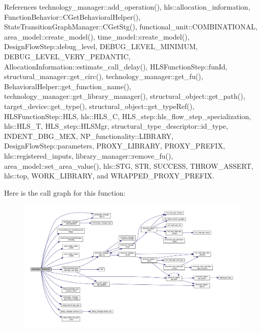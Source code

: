 References technology\+\_\+manager\+::add\+\_\+operation(), hls\+::allocation\+\_\+information, Function\+Behavior\+::\+C\+Get\+Behavioral\+Helper(), State\+Transition\+Graph\+Manager\+::\+C\+Get\+Stg(), functional\+\_\+unit\+::\+C\+O\+M\+B\+I\+N\+A\+T\+I\+O\+N\+AL, area\+\_\+model\+::create\+\_\+model(), time\+\_\+model\+::create\+\_\+model(), Design\+Flow\+Step\+::debug\+\_\+level, D\+E\+B\+U\+G\+\_\+\+L\+E\+V\+E\+L\+\_\+\+M\+I\+N\+I\+M\+UM, D\+E\+B\+U\+G\+\_\+\+L\+E\+V\+E\+L\+\_\+\+V\+E\+R\+Y\+\_\+\+P\+E\+D\+A\+N\+T\+IC, Allocation\+Information\+::estimate\+\_\+call\+\_\+delay(), H\+L\+S\+Function\+Step\+::fun\+Id, structural\+\_\+manager\+::get\+\_\+circ(), technology\+\_\+manager\+::get\+\_\+fu(), Behavioral\+Helper\+::get\+\_\+function\+\_\+name(), technology\+\_\+manager\+::get\+\_\+library\+\_\+manager(), structural\+\_\+object\+::get\+\_\+path(), target\+\_\+device\+::get\+\_\+type(), structural\+\_\+object\+::get\+\_\+type\+Ref(), H\+L\+S\+Function\+Step\+::\+H\+LS, hls\+::\+H\+L\+S\+\_\+C, H\+L\+S\+\_\+step\+::hls\+\_\+flow\+\_\+step\+\_\+specialization, hls\+::\+H\+L\+S\+\_\+T, H\+L\+S\+\_\+step\+::\+H\+L\+S\+Mgr, structural\+\_\+type\+\_\+descriptor\+::id\+\_\+type, I\+N\+D\+E\+N\+T\+\_\+\+D\+B\+G\+\_\+\+M\+EX, N\+P\+\_\+functionality\+::\+L\+I\+B\+R\+A\+RY, Design\+Flow\+Step\+::parameters, P\+R\+O\+X\+Y\+\_\+\+L\+I\+B\+R\+A\+RY, P\+R\+O\+X\+Y\+\_\+\+P\+R\+E\+F\+IX, hls\+::registered\+\_\+inputs, library\+\_\+manager\+::remove\+\_\+fu(), area\+\_\+model\+::set\+\_\+area\+\_\+value(), hls\+::\+S\+TG, S\+TR, S\+U\+C\+C\+E\+SS, T\+H\+R\+O\+W\+\_\+\+A\+S\+S\+E\+RT, hls\+::top, W\+O\+R\+K\+\_\+\+L\+I\+B\+R\+A\+RY, and W\+R\+A\+P\+P\+E\+D\+\_\+\+P\+R\+O\+X\+Y\+\_\+\+P\+R\+E\+F\+IX.

Here is the call graph for this function\+:
\nopagebreak
\begin{figure}[H]
\begin{center}
\leavevmode
\includegraphics[width=350pt]{d6/d81/classadd__library_a290796d0cb64ec96752255b3ae5cd3c2_cgraph}
\end{center}
\end{figure}


